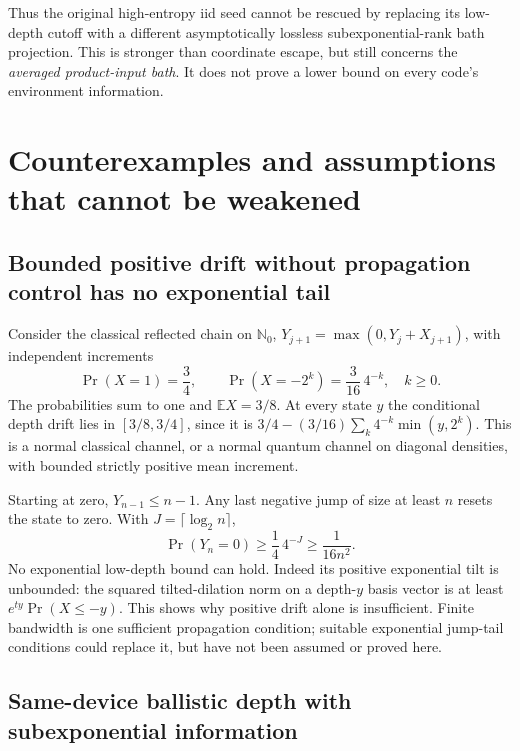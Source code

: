 Thus the original high-entropy iid seed cannot be rescued by replacing
its low-depth cutoff with a different asymptotically lossless
subexponential-rank bath projection. This is stronger than coordinate
escape, but still concerns the \emph{averaged product-input bath}.
It does not prove a lower bound on every code's environment information.



\section{Counterexamples and assumptions that cannot be weakened}

\subsection{Bounded positive drift without propagation control has no exponential tail}

Consider the classical reflected chain on $\mathbb N_0$,
$Y_{j+1}=\max(0,Y_j+X_{j+1})$, with independent increments
\[
 \Pr(X=1)=\frac34,\qquad
 \Pr(X=-2^k)=\frac3{16}\,4^{-k},\quad k\ge0.
 \tag{F1}
\]
The probabilities sum to one and $\mathbb EX=3/8$.
At every state $y$ the conditional depth drift lies in $[3/8,3/4]$,
since it is
$3/4-(3/16)\sum_k4^{-k}\min(y,2^k)$.
This is a normal classical channel, or a normal quantum channel on
diagonal densities, with bounded strictly positive mean increment.

Starting at zero, $Y_{n-1}\le n-1$. Any last negative jump of size at
least $n$ resets the state to zero. With $J=\lceil\log_2n\rceil$,
\[
 \Pr(Y_n=0)\ge\frac14\,4^{-J}\ge\frac1{16n^2}.
 \tag{F2}
\]
No exponential low-depth bound can hold. Indeed its positive exponential
tilt is unbounded: the squared tilted-dilation norm on a depth-$y$ basis
vector is at least $e^{ty}\Pr(X\le-y)$.
This shows why positive drift alone is insufficient. Finite bandwidth
is one sufficient propagation condition; suitable exponential jump-tail
conditions could replace it, but have not been assumed or proved here.

\subsection{Same-device ballistic depth with subexponential information}

